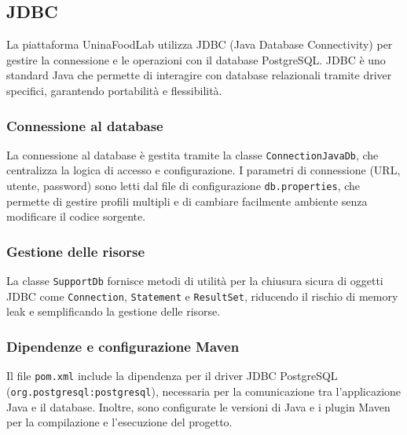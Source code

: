 \subsection{JDBC}
La piattaforma UninaFoodLab utilizza JDBC (Java Database Connectivity) per gestire la connessione e le operazioni con il database PostgreSQL. JDBC è uno standard Java che permette di interagire con database relazionali tramite driver specifici, garantendo portabilità e flessibilità.

\subsubsection{Connessione al database}
La connessione al database è gestita tramite la classe \texttt{ConnectionJavaDb}, che centralizza la logica di accesso e configurazione. I parametri di connessione (URL, utente, password) sono letti dal file di configurazione \texttt{db.properties}, che permette di gestire profili multipli e di cambiare facilmente ambiente senza modificare il codice sorgente.

\subsubsection{Gestione delle risorse}
La classe \texttt{SupportDb} fornisce metodi di utilità per la chiusura sicura di oggetti JDBC come \texttt{Connection}, \texttt{Statement} e \texttt{ResultSet}, riducendo il rischio di memory leak e semplificando la gestione delle risorse.

\subsubsection{Dipendenze e configurazione Maven}
Il file \texttt{pom.xml} include la dipendenza per il driver JDBC PostgreSQL (\texttt{org.postgresql:postgresql}), necessaria per la comunicazione tra l'applicazione Java e il database. Inoltre, sono configurate le versioni di Java e i plugin Maven per la compilazione e l'esecuzione del progetto.

